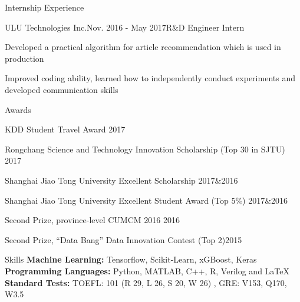 \documentclass{resume} %
\begin{document}
\begin{rSection}{Internship Experience}
\begin{rSubsection}{ULU Technologies Inc.}{Nov. 2016 - May 2017}{R$\&$D  Engineer Intern}{}
\item Developed a practical algorithm for article recommendation which is used in production 
\item Improved coding ability, learned how to independently conduct experiments and developed communication skills
\end{rSubsection}
\end{rSection}



\begin{rSection}{Awards}
\begin{rSubsection}{}{}{}{}
\item KDD Student Travel Award \hfill{2017}
\item Rongchang Science and Technology Innovation Scholarship (Top 30 in SJTU) \hfill{2017}
\item Shanghai Jiao Tong University Excellent Scholarship \hfill{2017$\&$2016}
\item Shanghai Jiao Tong University Excellent Student Award (Top 5\%)  \hfill{2017$\&$2016}
\item Second Prize, province-level CUMCM 2016 \hfill{2016}
\item Second Prize, ``Data Bang'' Data Innovation Contest (Top 2)\hfill{2015} 
\end{rSubsection}
\end{rSection}

\begin{rSection}{Skills}
{\bf Machine Learning: }
\hspace*{3.0 cm} Tensorflow, Scikit-Learn, xGBoost, Keras\\
{\bf Programming Languages: }
\hspace*{1.8 cm} Python, MATLAB, C++, R, Verilog and \LaTeX  \\
{\bf Standard Tests: }
\hspace*{3.53 cm} TOEFL: 101 (R 29, L 26, S 20, W 26) , GRE: V153, Q170, W3.5
\end{rSection}
\end{document}
